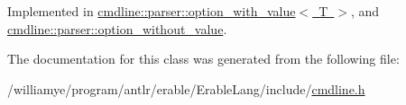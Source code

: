 Implemented in \mbox{\hyperlink{classcmdline_1_1parser_1_1option__with__value_aae5ed5d511506ab324d203d31abb4a28}{cmdline\+::parser\+::option\+\_\+with\+\_\+value$<$ T $>$}}, and \mbox{\hyperlink{classcmdline_1_1parser_1_1option__without__value_ad1dd50b3fd7c7020d817d1e173240ba3}{cmdline\+::parser\+::option\+\_\+without\+\_\+value}}.



The documentation for this class was generated from the following file\+:\begin{DoxyCompactItemize}
\item 
/williamye/program/antlr/erable/\+Erable\+Lang/include/\mbox{\hyperlink{cmdline_8h}{cmdline.\+h}}\end{DoxyCompactItemize}
